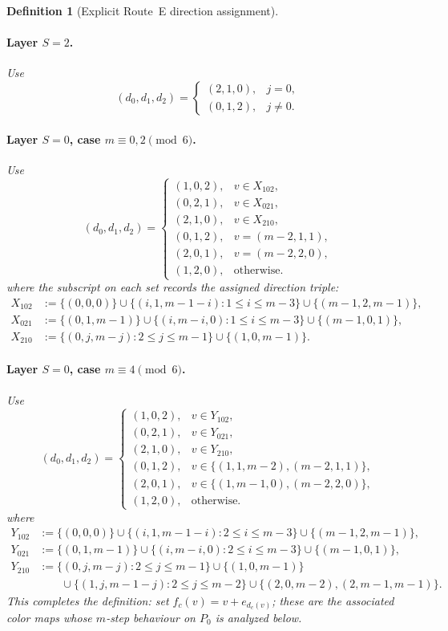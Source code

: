 \documentclass[11pt]{article}
\newtheorem{definition}{Definition}
\begin{document}
\begin{definition}[Explicit Route~E direction assignment]
\paragraph{Layer $S=2$.}
Use
\[
(d_0,d_1,d_2)=
\begin{cases}
(2,1,0), & j=0,\\
(0,1,2), & j\ne 0.
\end{cases}
\]

\paragraph{Layer $S=0$, case $m\equiv 0,2\pmod 6$.}
Use
\[
(d_0,d_1,d_2)=
\begin{cases}
(1,0,2), & v\in X_{102},\\
(0,2,1), & v\in X_{021},\\
(2,1,0), & v\in X_{210},\\
(0,1,2), & v=(m-2,1,1),\\
(2,0,1), & v=(m-2,2,0),\\
(1,2,0), & \text{otherwise.}
\end{cases}
\]
\smallskip\noindent
where the subscript on each set records the assigned direction triple:
\begin{align*}
X_{102}&:=\{(0,0,0)\}\cup\{(i,1,m-1-i):1\le i\le m-3\}\cup\{(m-1,2,m-1)\},\\
X_{021}&:=\{(0,1,m-1)\}\cup\{(i,m-i,0):1\le i\le m-3\}\cup\{(m-1,0,1)\},\\
X_{210}&:=\{(0,j,m-j):2\le j\le m-1\}\cup\{(1,0,m-1)\}.
\end{align*}

\paragraph{Layer $S=0$, case $m\equiv 4\pmod 6$.}
Use
\[
(d_0,d_1,d_2)=
\begin{cases}
(1,0,2), & v\in Y_{102},\\
(0,2,1), & v\in Y_{021},\\
(2,1,0), & v\in Y_{210},\\
(0,1,2), & v\in\{(1,1,m-2),(m-2,1,1)\},\\
(2,0,1), & v\in\{(1,m-1,0),(m-2,2,0)\},\\
(1,2,0), & \text{otherwise.}
\end{cases}
\]
where
\begin{align*}
Y_{102}&:=\{(0,0,0)\}\cup\{(i,1,m-1-i):2\le i\le m-3\}\cup\{(m-1,2,m-1)\},\\
Y_{021}&:=\{(0,1,m-1)\}\cup\{(i,m-i,0):2\le i\le m-3\}\cup\{(m-1,0,1)\},\\
Y_{210}&:=\{(0,j,m-j):2\le j\le m-1\}\cup\{(1,0,m-1)\}\\
&\hspace{2em}\cup\{(1,j,m-1-j):2\le j\le m-2\}\cup\{(2,0,m-2),(2,m-1,m-1)\}.
\end{align*}
This completes the definition: set $f_c(v)=v+e_{d_c(v)}$; these are the associated color maps whose $m$-step behaviour on $P_0$ is analyzed below.
\end{definition}
\end{document}
